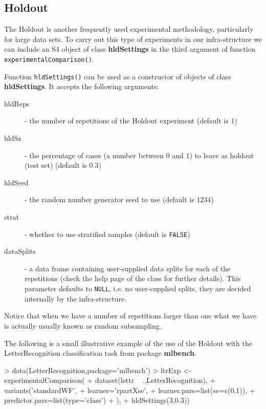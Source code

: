 \documentclass[10pt,a4paper]{article}
\begin{document}
\subsection{Holdout}

The Holdout is another frequently used experimental methodology,
particularly for large data sets. To carry out this type of
experiments in our infra-structure we can include an S4 object of
class \textbf{hldSettings} in the third argument of function
\texttt{experimentalComparison()}.

Function \texttt{hldSettings()} can be used as a constructor of
objects of class \textbf{hldSettings}. It accepts the following
arguments:

\begin{description}
\item[hldReps] - the number of repetitions of the Holdout experiment (default is $1$)
\item[hldSz] - the percentage  of cases (a number between 0 and 1) to leave as holdout (test set) (default is $0.3$)
\item[hldSeed] - the random number generator seed to use (default is $1234$)
\item[strat] - whether to use stratified samples (default is \texttt{FALSE})
\item[dataSplits] - a data frame containing user-supplied data splits
  for each of the repetitions (check the help page of the
  class for further details). This parameter defaults to
  \texttt{NULL}, i.e. no user-supplied splits, they are decided
  internally by the infra-structure.
\end{description}

Notice that when we have a number of repetitions larger than one what
we have is actually usually known as random subsampling.

The following is a small illustrative example of the use of the
Holdout with the LetterRecognition classification task from package
\textbf{mlbench}.

\begin{Schunk}
\begin{Sinput}
> data(LetterRecognition,package='mlbench')
> ltrExp <- experimentalComparison(
+   dataset(lettr ~ .,LetterRecognition),
+   variants('standardWF',
+            learner='rpartXse',
+            learner.pars=list(se=c(0,1)),
+            predictor.pars=list(type='class')
+            ),
+   hldSettings(3,0.3))
\end{Sinput}
\end{Schunk}
\end{document}
